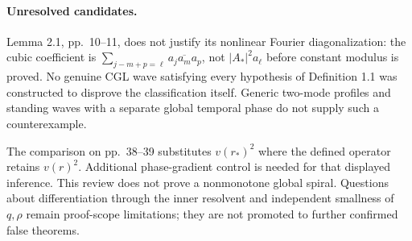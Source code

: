 \documentclass[10pt]{article}
\begin{document}
\paragraph*{Unresolved candidates.}\mbox{}\par
Lemma 2.1, pp. 10–11, does not justify its nonlinear Fourier diagonalization: the cubic coefficient is \(\sum_{j-m+p=\ell}a_j\overline{a_m}a_p\), not \(|A_*|^2a_\ell\) before constant modulus is proved. No genuine CGL wave satisfying every hypothesis of Definition 1.1 was constructed to disprove the classification itself. Generic two-mode profiles and standing waves with a separate global temporal phase do not supply such a counterexample.\par
The comparison on pp. 38–39 substitutes \(v(r_*)^2\) where the defined operator retains \(v(r)^2\). Additional phase-gradient control is needed for that displayed inference. This review does not prove a nonmonotone global spiral. Questions about differentiation through the inner resolvent and independent smallness of \(q,\rho\) remain proof-scope limitations; they are not promoted to further confirmed false theorems.\par
\end{document}
